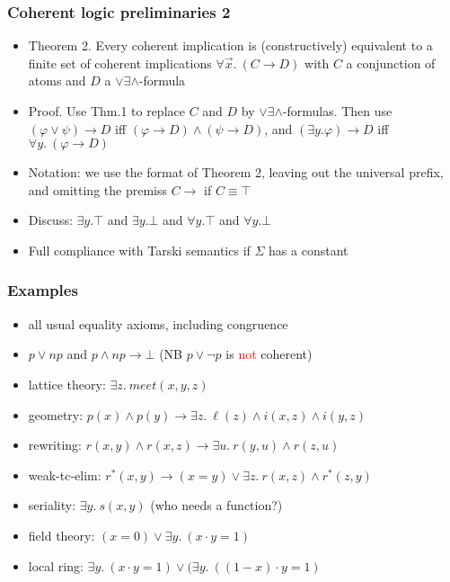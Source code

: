 \documentclass[handout,11pt]{beamer}
\newcommand{\red}[1]{\textcolor{red}{#1}}
\newcommand{\deca}{${\lor}{\exists}{\land}$}
\begin{document}
\begin{frame}
\frametitle{Coherent logic preliminaries 2}
 \begin{itemize}[<+->]   %
    \item Theorem 2. Every coherent implication is (constructively) 
    equivalent to a finite set of coherent implications
    $\forall\vec{x}.~(C \to D)$ 
    with $C$ a conjunction of atoms and $D$ a \deca-formula
    \item Proof. Use Thm.1 to replace $C$ and $D$ by \deca-formulas.
    Then use $(\varphi\lor\psi)\to D$ iff $(\varphi\to D)\land(\psi\to D)$,
    and $(\exists y.\varphi)\to D$ iff $\forall y.~(\varphi\to D)$
    \item Notation: we use the format of Theorem 2, 
    leaving out the universal prefix, and omitting the premiss $C\to{}$ 
    if $C\equiv\top$
    \item Discuss: $\exists y.\top$ and $\exists y.\bot$ and
    $\forall y.\top$ and $\forall y.\bot$
    \item Full compliance with Tarski semantics if $\Sigma$ has a constant
 \end{itemize}
\end{frame}

\begin{frame}
\frametitle{Examples}
 \begin{itemize}[<+->]   %
    \item all usual equality axioms, including congruence
    \item $p\lor np$ and $p\land np\to\bot$ 
    (NB $p\lor\neg p$ is \red{not} coherent)
    \item lattice theory: $%
    \exists z.~\mathit{meet}(x,y,z)$
    \item geometry: $%
    p(x)\land p(y) \to \exists z.~\ell(z) \land i(x,z) \land i(y,z)$
    \item rewriting: $%
    r(x,y)\land r(x,z) \to \exists u.~r(y,u)\land r(z,u)$
    \item weak-tc-elim: $%
    r^*(x,y)\to (x=y)\lor\exists z.~r(x,z)\land r^*(z,y)$     
    \item seriality: $%
    \exists y.~s(x,y)$ (who needs a function?)
    \item field theory: $%
    (x=0) \lor \exists y.~(x\cdot y=1)$
    \item local ring: 
    $\exists y.~(x\cdot y = 1) \lor (\exists y.~((1-x)\cdot y = 1)$
 \end{itemize}
\end{frame}
\end{document}
